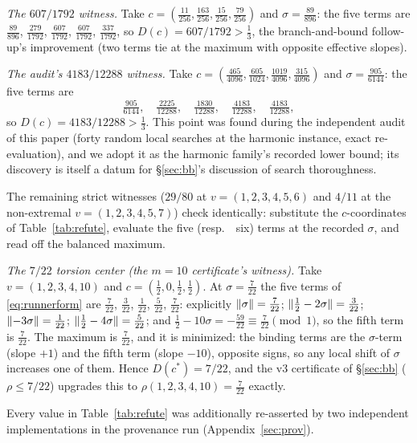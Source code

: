 \emph{The $607/1792$ witness.} Take
$c=(\tfrac{11}{256},\tfrac{163}{256},\tfrac{15}{256},
\tfrac{79}{256})$ and $\sigma=\tfrac{89}{896}$: the five terms are
$\tfrac{89}{896}$, $\tfrac{279}{1792}$, $\tfrac{607}{1792}$,
$\tfrac{607}{1792}$, $\tfrac{337}{1792}$, so $D(c)=607/1792>
\tfrac13$, the branch-and-bound follow-up's improvement (two terms tie
at the maximum with opposite effective slopes).

\emph{The audit's $4183/12288$ witness.} Take
$c=(\tfrac{465}{4096},\tfrac{605}{1024},\tfrac{1019}{4096},
\tfrac{315}{4096})$ and $\sigma=\tfrac{905}{6144}$: the five terms are
\[
\tfrac{905}{6144},\quad \tfrac{2225}{12288},\quad
\tfrac{1830}{12288},\quad \tfrac{4183}{12288},\quad
\tfrac{4183}{12288},
\]
so $D(c)=4183/12288>\tfrac13$. This point was found during the independent audit of this
paper (forty random local searches at the harmonic instance, exact
re-evaluation), and we adopt it as the harmonic family's recorded lower
bound; its discovery is itself a datum for \S\ref{sec:bb}'s discussion
of search thoroughness.

The remaining strict witnesses ($29/80$ at $v=(1,2,3,4,5,6)$ and $4/11$
at the non-extremal $v=(1,2,3,4,5,7)$) check identically: substitute the
$c$-coordinates of Table~\ref{tab:refute}, evaluate the five (resp.\ \
six) terms at the recorded $\sigma$, and read off the balanced maximum.

\emph{The $7/22$ torsion center (the $m=10$ certificate's witness).}
Take $v=(1,2,3,4,10)$ and $c=(\tfrac12,0,\tfrac12,\tfrac12)$. At
$\sigma=\tfrac{7}{22}$ the five terms of \eqref{eq:runnerform} are
$\tfrac{7}{22}$, $\tfrac{3}{22}$, $\tfrac{1}{22}$, $\tfrac{5}{22}$,
$\tfrac{7}{22}$: explicitly $\lVert \sigma \rVert=\tfrac7{22}$;
$\lVert \tfrac12-2\sigma \rVert=\tfrac3{22}$;
$\lVert -3\sigma \rVert=\tfrac1{22}$;
$\lVert \tfrac12-4\sigma \rVert=\tfrac5{22}$; and
$\tfrac12-10\sigma=-\tfrac{59}{22}\equiv\tfrac7{22}\pmod 1$, so the
fifth term is $\tfrac7{22}$. The maximum is $\tfrac7{22}$, and it is
minimized: the binding terms are the $\sigma$-term (slope $+1$) and
the fifth term (slope $-10$), opposite signs, so any local shift of
$\sigma$ increases one of them. Hence $D(c^\ast)=7/22$, and the v3
certificate of \S\ref{sec:bb} ($\rho\le7/22$) upgrades this to
$\rho(1,2,3,4,10)=\tfrac{7}{22}$ exactly.

Every value in Table~\ref{tab:refute} was additionally re-asserted by
two independent implementations in the provenance run
(Appendix~\ref{sec:prov}).
